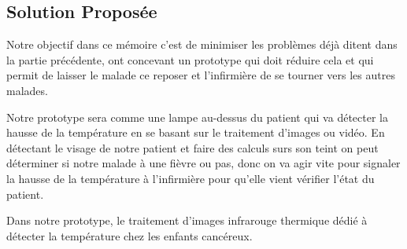 \documentclass[12pt]{article}
\begin{document}
\subsection{Solution Proposée}
Notre objectif dans ce mémoire c’est de minimiser les problèmes déjà ditent dans la partie précédente, ont concevant un prototype qui doit réduire cela et qui permit de laisser le malade ce reposer et l’infirmière de se tourner vers les autres malades. 

Notre prototype sera comme une lampe au-dessus du patient qui va détecter la hausse de la température en se basant sur le traitement d’images ou vidéo. En détectant le visage de notre patient et faire des calculs surs son teint on peut déterminer si notre malade à une fièvre ou pas, donc on va agir vite pour signaler la hausse de la température à l’infirmière pour qu’elle vient vérifier l’état du patient.

Dans notre prototype, le traitement d'images infrarouge thermique dédié à détecter la température chez les enfants cancéreux.

\newpage
	

	
\end{document}
